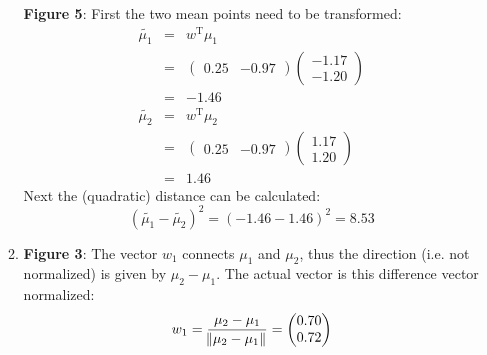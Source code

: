 \documentclass[DIN, pagenumber=false, fontsize=11pt, parskip=half]{scrartcl}
\begin{document}
\begin{enumerate}
\begin{enumerate}[label=\alph*)]
                    \textbf{Figure 5}: First the two mean points need to be transformed:
                    \begin{eqnarray*}
                        \tilde{\mu_1} &=& w^\text{T} \mu_1 \\
                        &=& 
                            \begin{pmatrix}
                                0.25 & -0.97
                            \end{pmatrix}
                            \begin{pmatrix}
                                -1.17 \\ -1.20
                            \end{pmatrix} \\
                        &=& -1.46 \\
                        \tilde{\mu_2} &=& w^\text{T} \mu_2 \\
                        &=& 
                            \begin{pmatrix}
                                0.25 & -0.97
                            \end{pmatrix}
                            \begin{pmatrix}
                                1.17 \\ 1.20
                            \end{pmatrix} \\
                        &=& 1.46
                    \end{eqnarray*}
                    Next the (quadratic) distance can be calculated:
                    \begin{equation*}
                        {(\tilde{\mu_1} - \tilde{\mu_2})}^2 
                            = {(-1.46 - 1.46)}^2
                            = 8.53
                    \end{equation*}
                \item
                    \textbf{Figure 3}: The vector $w_1$ connects $\mu_1$ and $\mu_2$, thus the direction (i.e. not normalized) is given by $\mu_2 - \mu_1$.
                    The actual vector is this difference vector normalized:
                    \begin{equation*}
                        w_1 = \frac{\mu_2 - \mu_1}{\norm{\mu_2 - \mu_1}}
                            = 
                            \begin{pmatrix}
                                0.70 \\ 0.72
                            \end{pmatrix}
                    \end{equation*}


\end{enumerate}
\end{enumerate}
\end{document}
